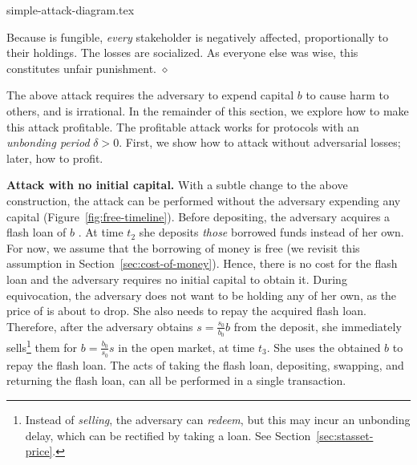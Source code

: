 {simple-attack-diagram.tex}


Because \stasset is fungible, \emph{every} stakeholder is negatively affected,
proportionally to their holdings.
The losses are socialized. As everyone else was
wise, this constitutes unfair punishment.
\hfill
$\diamond$


The above attack requires the adversary to expend capital $b$ to cause
harm to others, and is irrational. In the remainder of this section, we
explore how to make this attack profitable. The profitable attack works
for protocols with an \emph{unbonding period} $\delta > 0$. First, we show
how to attack without adversarial losses; later, how to profit.

\noindent
\textbf{Attack with no initial capital.}
With a subtle change to the above construction, the attack can be
performed without the adversary expending any capital (Figure~\ref{fig:free-timeline}).
Before depositing, the
adversary acquires a flash loan of $b$ \asset. At time $t_2$ she deposits \emph{those}
borrowed funds instead of her own.
For now, we assume that the borrowing of money is free (we
revisit this assumption in Section~\ref{sec:cost-of-money}).
Hence, there is no cost for the flash loan and the adversary
requires no initial capital to obtain it.
During equivocation, the adversary does not want to be holding any
\stasset of her own, as the price of \stasset is about to drop. She also
needs to repay the acquired flash loan.
Therefore, after the adversary obtains $s = \frac{s_0}{b_0} b$ \stasset
from the deposit, she immediately sells\footnote{Instead of \emph{selling}, the
adversary can \emph{redeem}, but this may incur an unbonding delay, which can
be rectified by taking a loan.  See Section~\ref{sec:stasset-price}.} them
for $b = \frac{b_0}{s_0} s$ \asset in the open market, at time $t_3$.
She uses the obtained $b$ \asset to
repay the flash loan.
The acts of taking the flash loan,
depositing, swapping, and returning the flash loan,
can all be performed in a single transaction.

